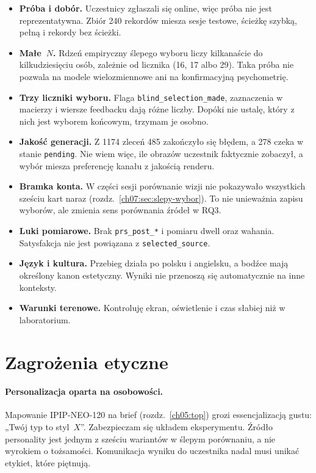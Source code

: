 \begin{itemize}
  \item \textbf{Próba i dobór.} Uczestnicy zgłaszali się online, więc próba nie jest reprezentatywna. Zbiór 240 rekordów miesza sesje testowe, ścieżkę szybką, pełną i rekordy bez ścieżki.
  \item \textbf{Małe~$N$.} Rdzeń empiryczny ślepego wyboru liczy kilkanaście do kilkudziesięciu osób, zależnie od licznika (16, 17 albo 29). Taka próba nie pozwala na modele wielozmiennowe ani na konfirmacyjną psychometrię.
  \item \textbf{Trzy liczniki wyboru.} Flaga \texttt{blind\_selection\_made}, zaznaczenia w macierzy i wiersze feedbacku dają różne liczby. Dopóki nie ustalę, który z nich jest wyborem końcowym, trzymam je osobno.
  \item \textbf{Jakość generacji.} Z 1174 zleceń 485 zakończyło się błędem, a 278 czeka w stanie \texttt{pending}. Nie wiem więc, ile obrazów uczestnik faktycznie zobaczył, a wybór miesza preferencję kanału z jakością renderu.
  \item \textbf{Bramka konta.} W części sesji porównanie wizji nie pokazywało wszystkich sześciu kart naraz (rozdz.~\ref{ch07:sec:slepy-wybor}). To nie unieważnia zapisu wyborów, ale zmienia sens porównania źródeł w RQ3.
  \item \textbf{Luki pomiarowe.} Brak \texttt{prs\_post\_*} i pomiaru dwell oraz wahania. Satysfakcja nie jest powiązana z \texttt{selected\_source}.
  \item \textbf{Język i kultura.} Przebieg działa po polsku i angielsku, a bodźce mają określony kanon estetyczny. Wyniki nie przenoszą się automatycznie na inne konteksty.
  \item \textbf{Warunki terenowe.} Kontroluję ekran, oświetlenie i czas słabiej niż w laboratorium.
\end{itemize}

\section{Zagrożenia etyczne}
\label{ch09:sec:etyka}

\paragraph{Personalizacja oparta na osobowości.}
Mapowanie IPIP-NEO-120 na brief (rozdz.~\ref{ch05:top}) grozi essencjalizacją gustu: „Twój typ to styl~$X$”. Zabezpieczam się układem eksperymentu. Źródło personality jest jednym z sześciu wariantów w ślepym porównaniu, a nie wyrokiem o tożsamości. Komunikacja wyniku do uczestnika nadal musi unikać etykiet, które piętnują.

